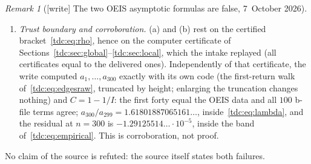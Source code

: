 \documentclass[11pt]{article}
\theoremstyle{definition}\newtheorem{definition}[theorem]{Definition}
\theoremstyle{remark}\newtheorem{remark}[theorem]{Remark}
\newcommand{\rhoh}{\rho_{\mathrm{hi}}}
\newcommand{\cl}{c_{\mathrm{lo}}}
\begin{document}
\begin{remark}[{[write]} The two OEIS asymptotic formulas are false, 7~October 2026]
\begin{enumerate}[label=(\alph*)]
{ with $t_n=(M/\cl)(\rhoh/R)^n$ the residual is at most
 $\{|1-\rho-\rho^2|+t_n(1+R+R^2)\}/(1-t_n)$, which is below $0.0002$ from
 $n=982$ on and decreases. So the comment's inequality holds for every
 $n\ge30$, resting on Theorem~\ref{tdc:thm:main} for $n\ge982$. Likewise
 $a_n/\phi^n$ decreases strictly for every $n\ge30$: exactly for
 $30\le n\le1250$, and from $n=1137$ on because
 $a_{n+1}/a_n\le\rho^{-1}(1+t_n\rho/R)/(1-t_n)<\phi$ there.)}
\item \emph{Trust boundary and corroboration.} (a) and (b) rest on the
 certified bracket~\eqref{tdc:eq:rho}, hence on the computer certificate of
 Sections~\ref{tdc:sec:global}--\ref{tdc:sec:local}, which the intake
 replayed (all certificates equal to the delivered ones). Independently of
 that certificate, the write computed $a_1,\dots,a_{300}$ exactly with its own
 code (the first-return walk of~\eqref{tdc:eq:edgesraw}, truncated by height;
 enlarging the truncation changes nothing) and $C=1-1/I$: the first forty
 equal the OEIS data and all $100$ b-file terms agree;
 $a_{300}/a_{299}=1.61801887065161\ldots$, inside~\eqref{tdc:eq:lambda}, and
 the residual at $n=300$ is $-1.29125514\ldots\cdot10^{-5}$, inside the band
 of~\eqref{tdc:eq:empirical}. This is corroboration, not proof.
\end{enumerate}
No claim of the source is refuted: the source itself states both failures.
\end{remark}
\end{document}
